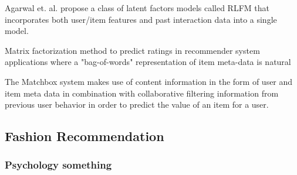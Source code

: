 

Agarwal et. al. \cite{Agarwal2009} propose a class of latent factors models called RLFM that incorporates both user/item features and past interaction data into a single model.



Matrix factorization method to predict ratings in recommender system applications where a "bag-of-words" representation of item meta-data is natural

The Matchbox system makes use of content information in the form of user and item meta data in combination with collaborative filtering information from previous user behavior in order to predict the value of an item for a user.


\subsection{Fashion Recommendation}

\subsubsection{Psychology something}



